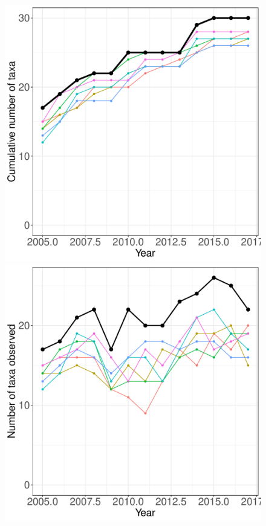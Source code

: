 \documentclass[11pt, oneside]{article}
\begin{document}
\begin{figure}[h!]
\centering
\includegraphics[scale = 0.4]{mcr-coral-castorani_species_accumulation_curve.pdf}
\includegraphics[scale = 0.4]{mcr-coral-castorani_num_taxa_over_time.pdf}

\end{figure}
\end{document}
